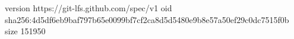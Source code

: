 version https://git-lfs.github.com/spec/v1
oid sha256:4d5df6eb9baf797b65e0099bf7cf2ca8d5d5480e9b8e57a50ef29c0dc7515f0b
size 151950
